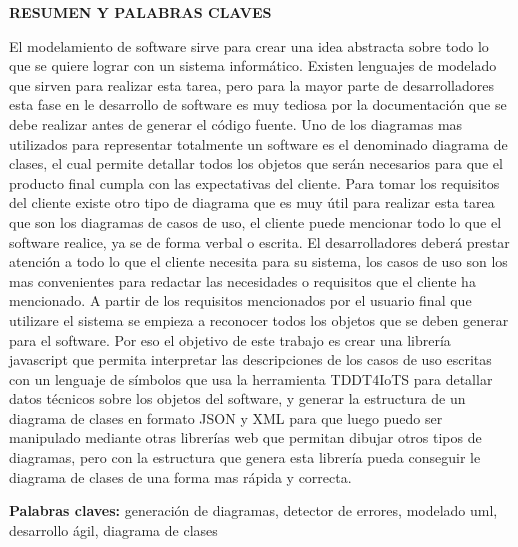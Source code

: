 \begin{center}
	{\titulodc \textbf{RESUMEN Y PALABRAS CLAVES}}
\end{center}

El modelamiento de software sirve para crear una idea abstracta sobre todo lo que se quiere lograr con un sistema informático. Existen lenguajes de modelado que sirven para realizar esta tarea, pero para la mayor parte de desarrolladores esta fase en le desarrollo de software es muy tediosa por la documentación que se debe realizar antes de generar el código fuente. Uno de los diagramas mas utilizados para representar totalmente un software es el denominado diagrama de clases, el cual permite detallar todos los objetos que serán necesarios para que el producto final cumpla con las expectativas del cliente. Para tomar los requisitos del cliente existe otro tipo de diagrama que es muy útil para realizar esta tarea que son los diagramas de casos de uso, el cliente puede mencionar todo lo que el software realice, ya se de forma verbal o escrita. El desarrolladores deberá prestar atención a todo lo que el cliente necesita para su sistema, los casos de uso son los mas convenientes para redactar las necesidades o requisitos que el cliente ha mencionado. A partir de los requisitos mencionados por el usuario final que utilizare el sistema se empieza a reconocer todos los objetos que se deben generar para el software. Por eso el objetivo de este trabajo es crear una librería javascript que permita interpretar las descripciones de los casos de uso escritas con un lenguaje de símbolos que usa la herramienta TDDT4IoTS para detallar datos técnicos sobre los objetos del software, y generar la estructura de un diagrama de clases en formato JSON y XML para que luego puedo ser manipulado mediante otras librerías web que permitan dibujar otros tipos de diagramas, pero con la estructura que genera esta librería pueda conseguir le diagrama de clases de una forma mas rápida y correcta. 

\textbf{Palabras claves:} generación de diagramas, detector de errores, modelado uml, desarrollo ágil, diagrama de clases
